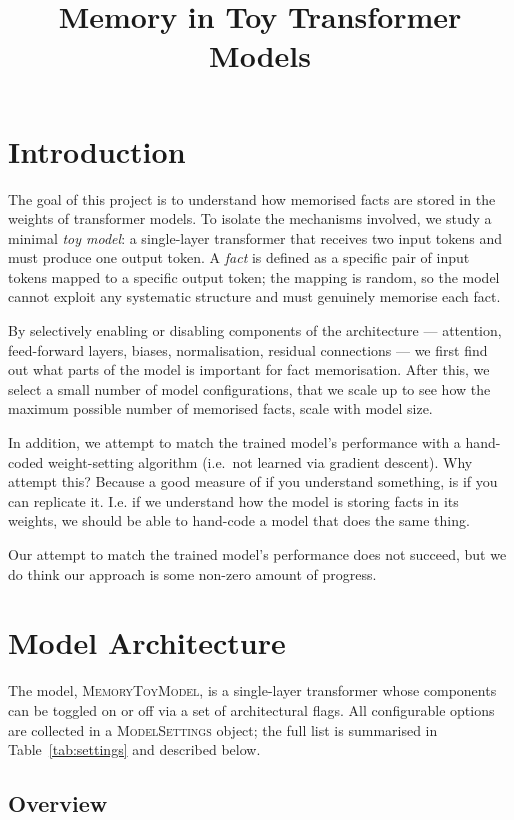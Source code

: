 \documentclass[11pt,a4paper]{article}
\title{Memory in Toy Transformer Models}
\author{}
\date{}
\begin{document}
\maketitle

\section{Introduction}

The goal of this project is to understand how memorised facts are stored in the weights of transformer models. To isolate the mechanisms involved, we study a minimal \emph{toy model}: a single-layer transformer that receives two input tokens and must produce one output token. A \emph{fact} is defined as a specific pair of input tokens mapped to a specific output token; the mapping is random, so the model cannot exploit any systematic structure and must genuinely memorise each fact.

By selectively enabling or disabling components of the architecture --- attention, feed-forward layers, biases, normalisation, residual connections --- we first find out what parts of the model is important for fact memorisation. After this, we select a small number of model configurations, that we scale up to see how the maximum possible number of memorised facts, scale with model size.

In addition, we attempt to match the trained model's performance with a hand-coded weight-setting algorithm (i.e.\ not learned via gradient descent). Why attempt this? Because a good measure of if you understand something, is if you can replicate it. I.e. if we understand how the model is storing facts in its weights, we should be able to hand-code a model that does the same thing.

Our attempt to match the trained model's performance does not succeed, but we do think our approach is some non-zero amount of progress.

\section{Model Architecture}
\label{sec:architecture}

The model, \textsc{MemoryToyModel}, is a single-layer transformer whose components can be toggled on or off via a set of architectural flags. All configurable options are collected in a \textsc{ModelSettings} object; the full list is summarised in Table~\ref{tab:settings} and described below.

\subsection{Overview}
\end{document}
